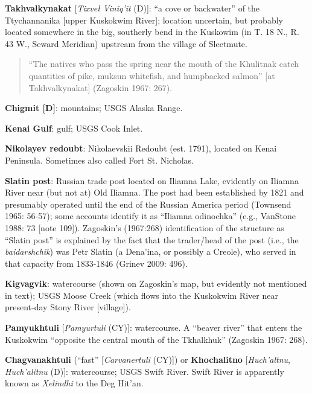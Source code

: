 \begin{hang}
\textbf{Takhvalkynakat} [\textit{Tixveł Viniq’it} (D)]: “a cove or backwater” of the Ttychannanika [upper Kuskokwim River]; location uncertain, but probably located somewhere in the big, southerly bend in the Kuskowim (in T. 18 N., R. 43 W., Seward Meridian) upstream from the village of Sleetmute.



\begin{quote}“The natives who pass the spring near the mouth of the Khulitnak catch quantities of pike, muksun whitefish, and humpbacked salmon” [at Takhvalkynakat] (Zagoskin 1967: 267).
\end{quote}



\textbf{Chigmit [D]}: mountains; USGS Alaska Range.



\textbf{Kenai Gulf}: gulf; USGS Cook Inlet.



\textbf{Nikolayev redoubt}: Nikolaevskii Redoubt (est. 1791), located on Kenai Peninsula. Sometimes also called Fort St. Nicholas.



\textbf{Slatin post}: Russian trade post located on Iliamna Lake, evidently on Iliamna River near (but not at) Old Iliamna. The post had been established by 1821 and presumably operated until the end of the Russian America period (Townsend 1965: 56-57); some accounts identify it as “Iliamna odinochka” (e.g., VanStone 1988: 73 [note 109]). Zagoskin’s (1967:268) identification of the structure as “Slatin post” is explained by the fact that the trader/head of the post (i.e., the \textit{baidarshchik}) was Petr Slatin (a Dena’ina, or possibly a Creole), who served in that capacity from 1833-1846 (Grinev 2009: 496).



\textbf{Kigvagvik}: watercourse (shown on Zagoskin’s map, but evidently not mentioned in text); USGS Moose Creek (which flows into the Kuskokwim River near present-day Stony River [village]).



\textbf{Pamyukhtuli} [\textit{Pamyurtuli} (CY)]: watercourse. A “beaver river” that enters the Kuskokwim “opposite the central mouth of the Tkhalkhuk” (Zagoskin 1967: 268).



\textbf{Chagvanakhtuli} (“fast” [\textit{Carvanertuli} (CY)]) or \textbf{Khochalitno} [\textit{Huch’altnu}, \textit{Huch’alitnu} (D)]: watercourse; USGS Swift River. Swift River is apparently known as \textit{Xelindhi} to the Deg Hit’an.




\end{hang}
